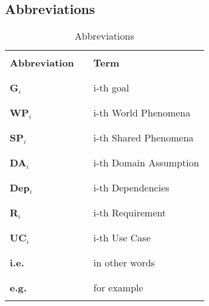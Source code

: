 \subsection{Abbreviations}
\begin{table}[H]
    \centering
    \renewcommand{\arraystretch}{0.5}
    \begin{tabular}{l l p{10.5cm}}
        \hline
                              &        &                            \\
        \textbf{Abbreviation} & \vline & \textbf{Term}              \\
                              &        &                            \\\hline & & \\
        \textbf{G}\(_i\)      & \vline & i-th goal                  \\
                              &        &                            \\\hline & & \\
        \textbf{WP}\(_i\)     & \vline & i-th World Phenomena       \\
                              &        &                            \\\hline & & \\
        \textbf{SP}\(_i\)     & \vline & i-th Shared Phenomena      \\
                              &        &                            \\\hline & & \\
        \textbf{DA}\(_i\)     & \vline & i-th Domain Assumption     \\
                              &        &                            \\\hline & & \\
        \textbf{Dep}\(_i\)    & \vline & i-th Dependencies          \\
                              &        &                            \\\hline & & \\
        \textbf{R}\(_i\)      & \vline & i-th Requirement           \\
                              &        &                            \\\hline & & \\
        \textbf{UC}\(_i\)     & \vline & i-th Use Case              \\
                              &        &                            \\\hline & & \\
        \textbf{i.e.}         & \vline & in other words             \\
                              &        &                            \\\hline & & \\
        \textbf{e.g.}         & \vline & for example                \\
                              &        &                            \\
        \hline
    \end{tabular}
    \caption{Abbreviations}
\end{table}

